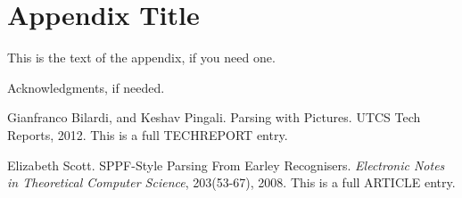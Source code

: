 \documentclass{sigplanconf}
\begin{document}
\section{Appendix Title}

This is the text of the appendix, if you need one.

\acks

Acknowledgments, if needed.





\begin{thebibliography}{}
\softraggedright

Gianfranco Bilardi, and Keshav Pingali. Parsing with Pictures. UTCS Tech Reports, 2012. This is a full TECHREPORT entry.

Elizabeth Scott. SPPF-Style Parsing From Earley Recognisers. \textit{Electronic Notes in Theoretical Computer Science}, 203(53-67), 2008. This is a full ARTICLE entry.

\end{thebibliography}
\end{document}
